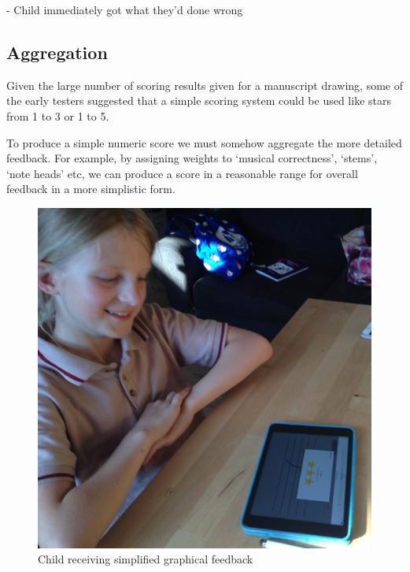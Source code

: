 - Child immediately got what they'd done wrong

\subsection{Aggregation}
Given the large number of scoring results given for a manuscript drawing, some of the early testers suggested that a simple scoring system could be used like stars from 1 to 3 or 1 to 5.

To produce a simple numeric score we must somehow aggregate the more detailed feedback. For example, by assigning weights to `musical correctness', `stems', `note heads' etc, we can produce a score in a reasonable range for overall feedback in a more simplistic form.

\begin{figure}[H]
  \includegraphics[width=\linewidth]{gfx/photos/user-receiving-feedback.jpg}
  \caption{Child receiving simplified graphical feedback}
\end{figure}
\clearpage
